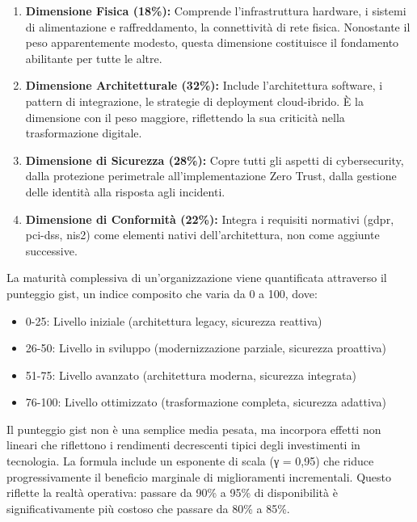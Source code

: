 \begin{enumerate}
\item \textbf{Dimensione Fisica (18\%):} Comprende l'infrastruttura hardware, i sistemi di alimentazione e raffreddamento, la connettività di rete fisica. Nonostante il peso apparentemente modesto, questa dimensione costituisce il fondamento abilitante per tutte le altre.

\item \textbf{Dimensione Architetturale (32\%):} Include l'architettura software, i pattern di integrazione, le strategie di deployment cloud-ibrido. È la dimensione con il peso maggiore, riflettendo la sua criticità nella trasformazione digitale.

\item \textbf{Dimensione di Sicurezza (28\%):} Copre tutti gli aspetti di cybersecurity, dalla protezione perimetrale all'implementazione Zero Trust, dalla gestione delle identità alla risposta agli incidenti.

\item \textbf{Dimensione di Conformità (22\%):} Integra i requisiti normativi (\gls{gdpr}, \gls{pci-dss}, \gls{nis2}) come elementi nativi dell'architettura, non come aggiunte successive.
\end{enumerate}

La maturità complessiva di un'organizzazione viene quantificata attraverso il punteggio \gls{gist}, un indice composito che varia da 0 a 100, dove:
\begin{itemize}
\item 0-25: Livello iniziale (architettura legacy, sicurezza reattiva)
\item 26-50: Livello in sviluppo (modernizzazione parziale, sicurezza proattiva)
\item 51-75: Livello avanzato (architettura moderna, sicurezza integrata)
\item 76-100: Livello ottimizzato (trasformazione completa, sicurezza adattiva)
\end{itemize}

\begin{tcolorbox}[
    colback=blue!5!white,
    colframe=blue!75!black,
    title={\textbf{Nota Metodologica:} Calcolo del Punteggio GIST},
    fonttitle=\bfseries
]
Il punteggio \gls{gist} non è una semplice media pesata, ma incorpora effetti non lineari che riflettono i rendimenti decrescenti tipici degli investimenti in tecnologia. La formula include un esponente di scala (γ = 0,95) che riduce progressivamente il beneficio marginale di miglioramenti incrementali. Questo riflette la realtà operativa: passare da 90\% a 95\% di disponibilità è significativamente più costoso che passare da 80\% a 85\%.
\end{tcolorbox}

